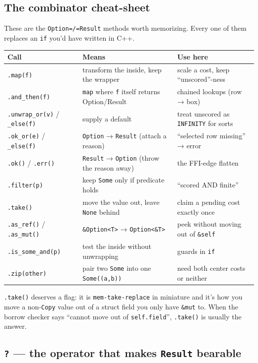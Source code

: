 \documentclass[11pt]{article}
\begin{document}
\subsection{The combinator cheat-sheet}
\label{sec:org730c7f9}

These are the \texttt{Option=/=Result} methods worth memorizing. Every one of them
replaces an \texttt{if} you'd have written in C++.

\begin{center}
\begin{tabular}{lll}
Call & Means & Use here\\
\hline
\texttt{.map(f)} & transform the inside, keep the wrapper & scale a cost, keep ``unscored''-ness\\
\texttt{.and\_then(f)} & \texttt{map} where \texttt{f} itself returns Option/Result & chained lookups (row → box)\\
\texttt{.unwrap\_or(v)} / \texttt{\_else(f)} & supply a default & treat unscored as \texttt{INFINITY} for sorts\\
\texttt{.ok\_or(e)} / \texttt{\_else(f)} & \texttt{Option} → \texttt{Result} (attach a reason) & ``selected row missing'' → error\\
\texttt{.ok()} / \texttt{.err()} & \texttt{Result} → \texttt{Option} (throw the reason away) & the FFI-edge flatten\\
\texttt{.filter(p)} & keep \texttt{Some} only if predicate holds & ``scored AND finite''\\
\texttt{.take()} & move the value out, leave \texttt{None} behind & claim a pending cost exactly once\\
\texttt{.as\_ref()} / \texttt{.as\_mut()} & \texttt{\&Option<T>} → \texttt{Option<\&T>} & peek without moving out of \texttt{\&self}\\
\texttt{.is\_some\_and(p)} & test the inside without unwrapping & guards in \texttt{if}\\
\texttt{.zip(other)} & pair two \texttt{Some} into one \texttt{Some((a,b))} & need both center costs or neither\\
\end{tabular}
\end{center}

\texttt{.take()} deserves a flag: it is \texttt{mem-take-replace} in miniature and it's how
you move a non-\texttt{Copy} value out of a struct field you only have \texttt{\&mut} to.
When the borrow checker says ``cannot move out of \texttt{self.field}'', \texttt{.take()} is
usually the answer.
\subsection{\texttt{?} — the operator that makes \texttt{Result} bearable}
\label{sec:org287c578}
\end{document}
